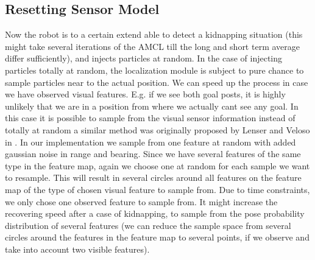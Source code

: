 \documentclass[	DIV=calc,%
							paper=a4,%
							fontsize=9pt,%
							twocolumn]{scrartcl}	 					%
\begin{document}
\subsection{Resetting Sensor Model}
\label{sec:Reset}
Now the robot is to a certain extend able to detect a kidnapping situation (this might take several iterations of the AMCL till the long and short term average differ sufficiently), and injects particles at random. 
In the case of injecting particles totally at random, the localization module is subject to pure chance to sample particles near to the actual position. We can speed up the process in case we have observed visual features. E.g. if we see both goal posts, it is highly unlikely that we are in a position from where we actually cant see any goal.
In this case it is possible to sample from the visual sensor information instead of totally at random a similar method  was originally proposed by Lenser and Veloso  in \cite{SensorResetting}. In our implementation we sample from one feature at random with added gaussian noise in range and bearing. Since we have several features of the same type in the feature map, again we choose one at random for each sample we want to resample. This will result in several circles around all features on the feature map of the type of chosen visual feature to sample from. Due to time constraints, we only chose one observed feature to sample from.
It might increase the recovering speed after a case of kidnapping, to sample from the pose probability distribution of several features (we can reduce the sample space from several circles around the features in the feature map to several points, if we observe and take into account two visible features).
\end{document}

